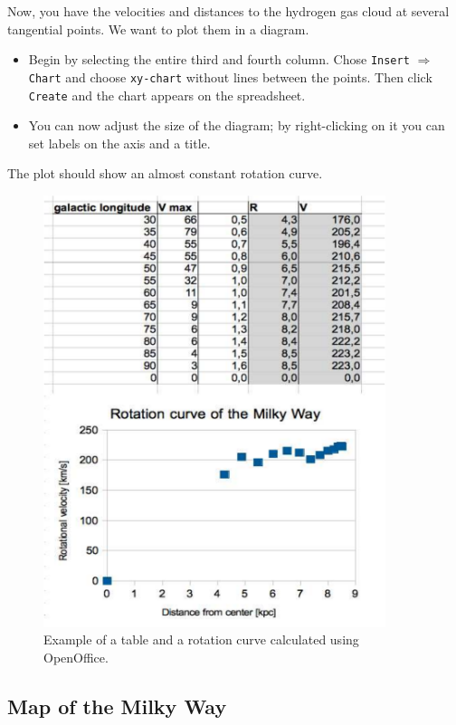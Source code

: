 Now, you have the velocities and distances to the hydrogen gas cloud at several tangential 
points. We want to plot them in a diagram.  

\begin{itemize}

\item Begin by selecting
the entire third and fourth column. Chose {\tt Insert} $\Rightarrow$
{\tt Chart} and choose {\tt xy-chart} without lines between the points. Then
click {\tt Create} and the chart appears on the spreadsheet.

\item You can now adjust the size of the diagram; by right-clicking on it 
you can set labels on the axis and a title.

\end{itemize}

The plot should show an almost constant rotation curve. 

\begin{figure}[t]
\begin{center}
\includegraphics[width=10cm]{../figures/openofficerotation.pdf}
\caption{Example of a table and a rotation curve calculated using OpenOffice.}
\label{spread}
\end{center}
\end{figure}

\subsection{Map of the Milky Way}

